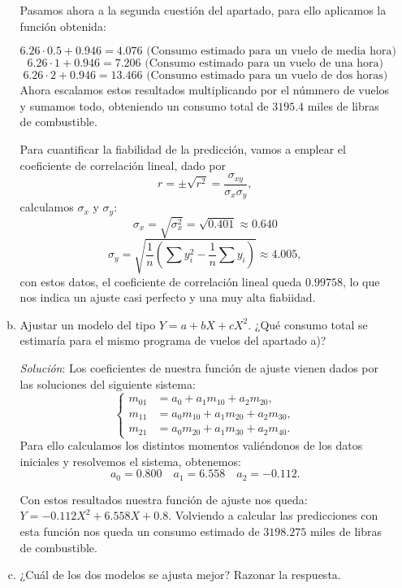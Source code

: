 \documentclass[10pt,a4paper]{article}
\begin{document}
\begin{enumerate}
\begin{enumerate}[a)]
                    Pasamos ahora a la segunda cuestión del apartado, para ello aplicamos la función obtenida:


                    \[ 6.26\cdot 0.5+0.946 = 4.076 \text{ (Consumo estimado para un vuelo de media hora)}\]\[6.26 \cdot 1 + 0.946 = 7.206 \text{ (Consumo estimado para un vuelo de una hora)}\]\[6.26 \cdot 2 + 0.946 = 13.466 \text{ (Consumo estimado para un vuelo de dos horas)}\] Ahora escalamos estos resultados multiplicando por el númmero de vuelos y sumamos todo, obteniendo un consumo total de \(3195.4\) miles de libras de combustible.
                    
                    Para cuantificar la fiabilidad de la predicción, vamos a emplear el coeficiente de correlación lineal, dado por \[r=\pm\sqrt{r^2}=\frac{\sigma_{xy}}{\sigma_x\sigma_y},\] calculamos \(\sigma_x\) y \(\sigma_y\): \[\sigma_x=\sqrt{\sigma_x^2}=\sqrt{0.401}\approx0.640\]\[\sigma_y=\sqrt{\frac{1}{n}\left(\sum y_i^2-\frac{1}{n}\sum y_i\right)}\approx 4.005,\] con estos datos, el coeficiente de correlación lineal queda \(0.99758\), lo que nos indica un ajuste casi perfecto y una muy alta fiabiidad.
                
                \item  Ajustar un modelo del tipo \(Y=a+bX+cX^2\). ¿Qué consumo total se estimaría para el mismo programa de vuelos del apartado a)?

                    \emph{Solución}: Los coeficientes de nuestra función de ajuste vienen dados por las soluciones del siguiente sistema:
                    \begin{equation*}
                    \left\{ \begin{array}{rl}
                        m_{01} &= a_0 + a_1 m_{10} + a_2 m_{20}, \\
                        m_{11} &= a_0 m_{10} + a_1 m_{20} + a_2 m_{30}, \\
                        m_{21} &= a_0 m_{20} + a_1 m_{30} + a_2 m_{40}.                    
                    \end{array}\right.
                    \end{equation*}
Para ello calculamos los distintos momentos valiéndonos de los datos iniciales y resolvemos el sistema, obtenemos:
\[
a_0 = 0.800 \quad a_1 = 6.558 \quad a_2 = -0.112.
\]

Con estos resultados nuestra función de ajuste nos queda: \(Y = -0.112X^2 + 6.558X + 0.8\). Volviendo a calcular las predicciones con esta función nos queda un consumo estimado de \(3198.275\) miles de libras de combustible. 
\item ¿Cuál de los dos modelos se ajusta mejor? Razonar la respuesta.


\end{enumerate}
\end{enumerate}
\end{document}
